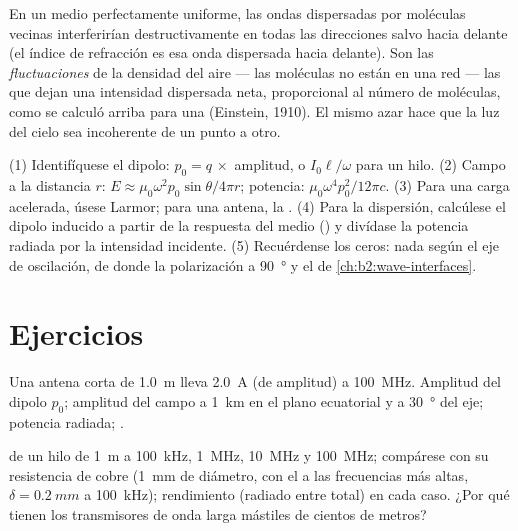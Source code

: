 \begin{remark}\label{rem:b2:dipole-radiation:why}
En un medio perfectamente uniforme, las ondas dispersadas por moléculas
vecinas interferirían destructivamente en todas las direcciones salvo hacia delante
(el índice de refracción es esa onda dispersada hacia delante). Son las
\emph{fluctuaciones} de la densidad del aire --- las moléculas no están en una
red --- las que dejan una intensidad dispersada neta, proporcional al
número de moléculas, como se calculó arriba para una (Einstein, 1910). El
mismo azar hace que la luz del cielo sea incoherente de un punto a otro.
\end{remark}

\begin{method}\label{met:b2:dipole-radiation:method}
(1) Identifíquese el dipolo: $p_0 = q\,\times$ amplitud, o $I_0\ell/\omega$ para un
hilo. (2) Campo a la distancia $r$: $E \approx \mu_0\omega^2p_0\sin\theta/4\pi r$; potencia:
$\mu_0\omega^4p_0^2/12\pi c$. (3) Para una carga acelerada, úsese Larmor; para
una antena, la . (4) Para la dispersión, calcúlese el
dipolo inducido a partir de la respuesta del medio () y divídase
la potencia radiada por la intensidad incidente. (5) Recuérdense los ceros:
nada según el eje de oscilación, de donde la polarización a
\qty{90}{\degree} y el  de \cref{ch:b2:wave-interfaces}.
\end{method}

\section{Ejercicios}

\begin{exercise}[$\star$]\label{exo:b2:dipole-radiation:1}
Una antena corta de \qty{1.0}{m} lleva \qty{2.0}{A} (de amplitud) a
\qty{100}{MHz}. Amplitud del dipolo $p_0$; amplitud del campo a \qty{1}{km} en el
plano ecuatorial y a \qty{30}{\degree} del eje; potencia radiada;
.
\end{exercise}

\begin{exercise}[$\star$]\label{exo:b2:dipole-radiation:2}
 de un hilo de \qty{1}{m} a \qty{100}{kHz}, \qty{1}{MHz},
\qty{10}{MHz} y \qty{100}{MHz}; compárese con su resistencia de cobre
(\qty{1}{mm} de diámetro, con el  a las frecuencias más altas,
$\delta = \qty{0.2}{mm}$ a \qty{100}{kHz}); rendimiento (radiado entre total)
en cada caso. ¿Por qué tienen los transmisores de onda larga mástiles de cientos de
metros?
\end{exercise}

